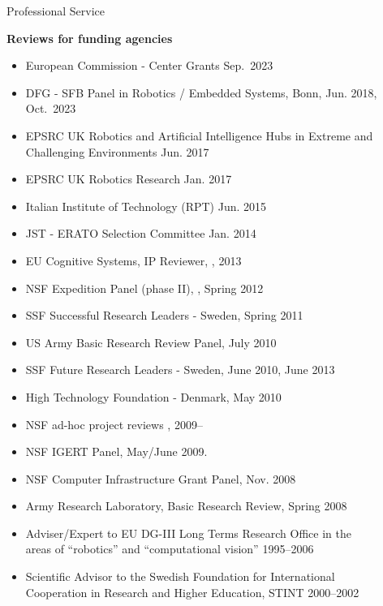 \documentclass{article}
\begin{document}
\begin{cv}
\begin{cvlist}{Professional Service}
\item {\bf Reviews for funding agencies}
  \begin{itemize}
  \item European Commission - Center Grants \cftdotfill{\cftdotsep} Sep.~2023
  \item DFG - SFB Panel in Robotics / Embedded Systems,
    Bonn,\cftdotfill{\cftdotsep} Jun. 2018, Oct.~2023
  \item EPSRC UK Robotics and Artificial Intelligence Hubs in Extreme
    and Challenging Environments \cftdotfill{\cftdotsep} Jun. 2017
  \item EPSRC UK Robotics Research  \cftdotfill{\cftdotsep} Jan. 2017
  \item Italian Institute of Technology (RPT) \cftdotfill{\cftdotsep}
    Jun. 2015
 \item JST - ERATO Selection Committee \cftdotfill{\cftdotsep} Jan. 2014
 \item EU Cognitive Systems, IP Reviewer, \cftdotfill{\cftdotsep}, 2013
 \item NSF Expedition Panel (phase II), \cftdotfill{\cftdotsep},
   Spring 2012
 \item SSF Successful Research Leaders - Sweden,
   \cftdotfill{\cftdotsep} Spring 2011
 \item US Army Basic Research Review Panel, \cftdotfill{\cftdotsep} July 2010
 \item SSF Future Research Leaders - Sweden, \cftdotfill{\cftdotsep} June 2010, June 2013
 \item High Technology Foundation - Denmark, \cftdotfill{\cftdotsep}  May 2010
 \item NSF ad-hoc project reviews \cftdotfill{\cftdotsep}, 2009--
 \item NSF IGERT Panel, \cftdotfill{\cftdotsep} May/June 2009.
 \item NSF Computer Infrastructure Grant Panel,  \cftdotfill{\cftdotsep} Nov. 2008
 \item Army Research Laboratory, Basic Research Review, \cftdotfill{\cftdotsep}  Spring 2008
 \item Adviser/Expert to EU DG-III Long Terms Research Office in the\\
   areas of ``robotics'' and ``computational vision''
   \cftdotfill{\cftdotsep}  1995--2006
 \item Scientific Advisor to the Swedish Foundation for International\\
   Cooperation in Research and Higher Education,  STINT
   \cftdotfill{\cftdotsep}  2000--2002

\end{itemize}
\end{cvlist}
\end{cv}
\end{document}
